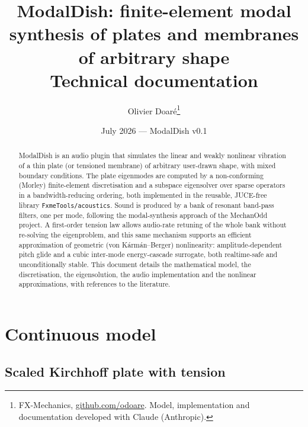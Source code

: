 \documentclass[11pt,a4paper]{article}
\title{ModalDish: finite-element modal synthesis of plates and membranes
       of arbitrary shape\\[1ex]
       \large Technical documentation}
\author{Olivier Doaré\thanks{FX-Mechanics, \url{github.com/odoare}. Model,
        implementation and documentation developed with Claude (Anthropic).}}
\date{July 2026 --- ModalDish v0.1}
\newcommand{\code}[1]{\texttt{#1}}
\begin{document}
\maketitle

\begin{abstract}
ModalDish is an audio plugin that simulates the linear and weakly nonlinear
vibration of a thin plate (or tensioned membrane) of arbitrary user-drawn
shape, with mixed boundary conditions. The plate eigenmodes are computed by
a non-conforming (Morley) finite-element discretisation and a subspace
eigensolver over sparse operators in a bandwidth-reducing ordering, both
implemented in the reusable, JUCE-free library
\code{FxmeTools/acoustics}. Sound is produced by a bank of resonant
band-pass filters, one per mode, following the modal-synthesis approach of
the MechanOdd project. A first-order tension law allows audio-rate retuning
of the whole bank without re-solving the eigenproblem, and this same
mechanism supports an efficient approximation of geometric (von
K\'arm\'an--Berger) nonlinearity: amplitude-dependent pitch glide and a
cubic inter-mode energy-cascade surrogate, both realtime-safe and
unconditionally stable. This document details the mathematical model, the
discretisation, the eigensolution, the audio implementation and the
nonlinear approximations, with references to the literature.
\end{abstract}

\tableofcontents

\section{Continuous model}
\label{sec:model}

\subsection{Scaled Kirchhoff plate with tension}
\end{document}
